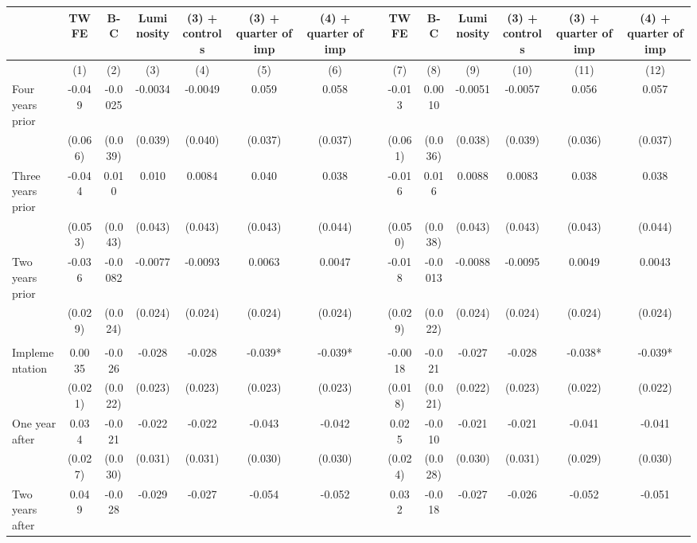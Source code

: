 \begin{tabular}{lccccccccccccc}
\toprule
      & TWFE  & B-C   & Luminosity & (3) + controls & (3) + quarter of imp & (4) + quarter of imp &       & TWFE  & B-C   & Luminosity & (3) + controls & (3) + quarter of imp & (4) + quarter of imp \\
\midrule
      & (1)   & (2)   & (3)   & (4)   & (5)   & (6)   &       & (7)   & (8)   & (9)   & (10)  & (11)  & (12) \\
\midrule
\midrule
Four years prior & -0.049 & -0.0025 & -0.0034 & -0.0049 & 0.059 & 0.058 &       & -0.013 & 0.0010 & -0.0051 & -0.0057 & 0.056 & 0.057 \\
      & (0.066) & (0.039) & (0.039) & (0.040) & (0.037) & (0.037) &       & (0.061) & (0.036) & (0.038) & (0.039) & (0.036) & (0.037) \\
Three years prior & -0.044 & 0.010 & 0.010 & 0.0084 & 0.040 & 0.038 &       & -0.016 & 0.016 & 0.0088 & 0.0083 & 0.038 & 0.038 \\
      & (0.053) & (0.043) & (0.043) & (0.043) & (0.043) & (0.044) &       & (0.050) & (0.038) & (0.043) & (0.043) & (0.043) & (0.044) \\
Two years prior & -0.036 & -0.0082 & -0.0077 & -0.0093 & 0.0063 & 0.0047 &       & -0.018 & -0.0013 & -0.0088 & -0.0095 & 0.0049 & 0.0043 \\
      & (0.029) & (0.024) & (0.024) & (0.024) & (0.024) & (0.024) &       & (0.029) & (0.022) & (0.024) & (0.024) & (0.024) & (0.024) \\
      &       &       &       &       &       &       &       &       &       &       &       &       &  \\
Implementation & 0.0035 & -0.026 & -0.028 & -0.028 & -0.039* & -0.039* &       & -0.0018 & -0.021 & -0.027 & -0.028 & -0.038* & -0.039* \\
      & (0.021) & (0.022) & (0.023) & (0.023) & (0.023) & (0.023) &       & (0.018) & (0.021) & (0.022) & (0.023) & (0.022) & (0.022) \\
One year after & 0.034 & -0.021 & -0.022 & -0.022 & -0.043 & -0.042 &       & 0.025 & -0.010 & -0.021 & -0.021 & -0.041 & -0.041 \\
      & (0.027) & (0.030) & (0.031) & (0.031) & (0.030) & (0.030) &       & (0.024) & (0.028) & (0.030) & (0.031) & (0.029) & (0.030) \\
Two years after & 0.049 & -0.028 & -0.029 & -0.027 & -0.054 & -0.052 &       & 0.032 & -0.018 & -0.027 & -0.026 & -0.052 & -0.051 \\

\end{tabular}
